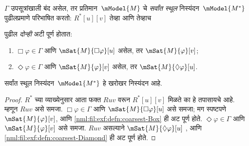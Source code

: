 \begin{defn}
  $\Gamma$ उपसूत्रांखाली बंद असेल, तर प्रतिमान~$\mModel{M}$
  चे \emph{सर्वांत स्थूल} निस्यंदन~$\mModel{M^*}$
  पुढीलप्रमाणे परिभाषित करतो:
  $R^*[u][v]$ तेव्हा आणि तेव्हाच

    पुढील \emph{दोन्ही} अटी पूर्ण होतात:
  \begin{enumerate}
  \item \label{nml:fil:exf:defn:coarsest-Box}$\Box\varphi \in \Gamma$
    आणि $\mSat{M}{\Box\varphi}[u]$ असेल, तर
    $\mSat{M}{\varphi}[v]$;
  \item \label{nml:fil:exf:defn:coarsest-Diamond}$\Diamond\varphi
    \in \Gamma$ आणि $\mSat{M}{\varphi}[v]$ असेल, तर
    $\mSat{M}{\Diamond\varphi}[u]$.
  \end{enumerate}
\end{defn}

\begin{prop}
  सर्वांत स्थूल निस्यंदन~$\mModel{M^*}$ हे खरोखर निस्यंदन आहे.
\end{prop}

\begin{proof}
  $R^*$ च्या व्याख्येनुसार आता फक्त $Ruv$ वरून
  $R^*[u][v]$ मिळते का हे तपासायचे आहे. म्हणून
  $Ruv$ असे समजा. $\Box\varphi \in \Gamma$
    आणि $\mSat{M}{\Box\varphi}[u]$ असे समजा; मग स्पष्टपणे
    $\mSat{M}{\varphi}[v]$, आणि
      \ref{nml:fil:exf:defn:coarsest-Box} ही अट पूर्ण होते.
    $\Diamond\varphi \in \Gamma$ आणि $\mSat{M}{\varphi}[v]$
    असे समजा. $Ruv$ असल्याने $\mSat{M}{\Diamond\varphi}[u]$
    , आणि \ref{nml:fil:exf:defn:coarsest-Diamond}
      ही अट पूर्ण होते.
\end{proof}

